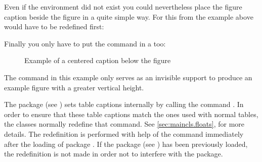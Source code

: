 \begin{Example}
Even if the  environment did not exist you
could nevertheless place the figure caption beside the figure in a
quite simple way. For this  from the example above
would have to be redefined first:
\begin{lstcode}
  \renewcommand{\SetFigureBox}{%
    \settowidth{\captionwidth}{\usebox{\FigureBox}}%
    \parbox[b]{\captionwidth}{\usebox{\FigureBox}}%
    \hfill%
    \addtolength{\captionwidth}{1em}%
    \addtolength{\captionwidth}{-\hsize}%
    \setlength{\captionwidth}{-\captionwidth}%
    \setcapwidth[c]{\captionwidth}%
    }
\end{lstcode}
Finally you only have to put the  command in a
 too:
\begin{lstcode}
  \begin{figure}
    \centering%
    \begin{FigureSetsCaptionWidth}
      \fbox{\rule{0pt}{5\baselineskip}%
        \hspace{1em}\KOMAScript\hspace{1em}}
    \end{FigureSetsCaptionWidth}
    \parbox[b]{\FigureWidth}{%
      \caption{Example of a centered caption
               below the figure}
    }
  \end{figure}
\end{lstcode}
The  command in this example only serves as an invisible
support to produce an example figure with a greater vertical height.
\end{Example}
%
%
%
%

\begin{Declaration}
\end{Declaration}%
%
%
The package
 (see \cite{package:longtable})
sets table captions internally by calling the command .
In order to ensure that these table captions match the ones used with normal
tables, the {\KOMAScript} classes normally redefine that command. See
\autoref{sec:maincls.floats}, 
for more details. The redefinition is performed with help of the command
 immediately after the loading of package
.  If the package 
(see \cite{package:caption}) has been previously loaded, the redefinition is
not made in order not to interfere with the  package.
%
%
%

